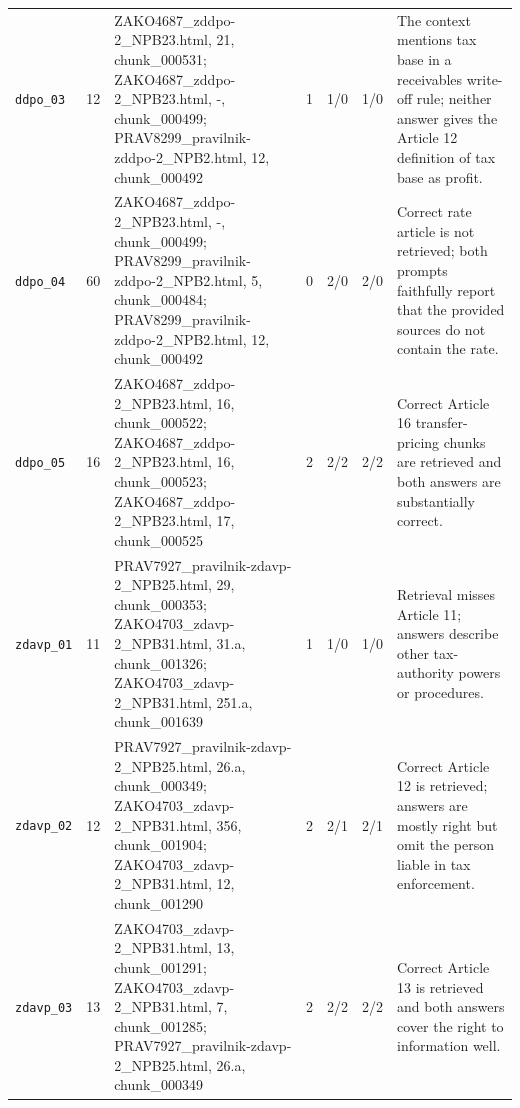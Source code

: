 \documentclass[11pt,a4paper]{article}
\begin{document}
\begin{landscape}
\begin{longtable}{p{1.7cm}p{1.2cm}p{6.0cm}p{1.3cm}p{1.4cm}p{1.4cm}p{6.0cm}}
\texttt{ddpo\_03} & 12 & ZAKO4687\_zddpo-2\_NPB23.html, 21, chunk\_000531; ZAKO4687\_zddpo-2\_NPB23.html, -, chunk\_000499; PRAV8299\_pravilnik-zddpo-2\_NPB2.html, 12, chunk\_000492 & 1 & 1/0 & 1/0 & The context mentions tax base in a receivables write-off rule; neither answer gives the Article 12 definition of tax base as profit. \\
\texttt{ddpo\_04} & 60 & ZAKO4687\_zddpo-2\_NPB23.html, -, chunk\_000499; PRAV8299\_pravilnik-zddpo-2\_NPB2.html, 5, chunk\_000484; PRAV8299\_pravilnik-zddpo-2\_NPB2.html, 12, chunk\_000492 & 0 & 2/0 & 2/0 & Correct rate article is not retrieved; both prompts faithfully report that the provided sources do not contain the rate. \\
\texttt{ddpo\_05} & 16 & ZAKO4687\_zddpo-2\_NPB23.html, 16, chunk\_000522; ZAKO4687\_zddpo-2\_NPB23.html, 16, chunk\_000523; ZAKO4687\_zddpo-2\_NPB23.html, 17, chunk\_000525 & 2 & 2/2 & 2/2 & Correct Article 16 transfer-pricing chunks are retrieved and both answers are substantially correct. \\
\texttt{zdavp\_01} & 11 & PRAV7927\_pravilnik-zdavp-2\_NPB25.html, 29, chunk\_000353; ZAKO4703\_zdavp-2\_NPB31.html, 31.a, chunk\_001326; ZAKO4703\_zdavp-2\_NPB31.html, 251.a, chunk\_001639 & 1 & 1/0 & 1/0 & Retrieval misses Article 11; answers describe other tax-authority powers or procedures. \\
\texttt{zdavp\_02} & 12 & PRAV7927\_pravilnik-zdavp-2\_NPB25.html, 26.a, chunk\_000349; ZAKO4703\_zdavp-2\_NPB31.html, 356, chunk\_001904; ZAKO4703\_zdavp-2\_NPB31.html, 12, chunk\_001290 & 2 & 2/1 & 2/1 & Correct Article 12 is retrieved; answers are mostly right but omit the person liable in tax enforcement. \\
\texttt{zdavp\_03} & 13 & ZAKO4703\_zdavp-2\_NPB31.html, 13, chunk\_001291; ZAKO4703\_zdavp-2\_NPB31.html, 7, chunk\_001285; PRAV7927\_pravilnik-zdavp-2\_NPB25.html, 26.a, chunk\_000349 & 2 & 2/2 & 2/2 & Correct Article 13 is retrieved and both answers cover the right to information well. \\
\bottomrule
\end{longtable}
\end{landscape}
\end{document}
